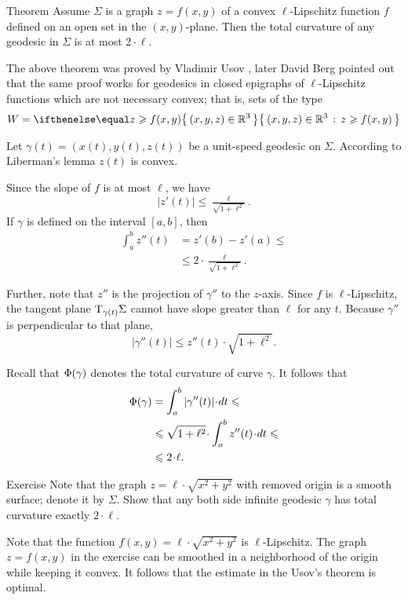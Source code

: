 \begin{thm}{Theorem}\label{thm:usov}
Assume $\Sigma$ is a graph $z=f(x,y)$ of a convex $\ell$-Lipschitz function $f$ defined on an open set in the $(x,y)$-plane.
Then the total curvature of any geodesic in $\Sigma$ is at most $2\cdot \ell$.
\end{thm}

The above theorem was proved by Vladimir Usov \cite{usov},
later David Berg \cite{berg} pointed out that the same proof works for geodesics in closed epigraphs of $\ell$-Lipschitz functions which are not necessary convex; that is, sets of the type 
\[W=\set{(x,y,z)\in\RR^3}{z\ge f(x,y)}\]

Let $\gamma(t)=(x(t),y(t),z(t))$ be a unit-speed geodesic on $\Sigma$.
According to Liberman's lemma 
$z(t)$ is convex.

Since the slope of $f$ is at most $\ell$, we have
\[|z'(t)|\le \tfrac{\ell}{\sqrt{1+\ell^2}}.\]
If $\gamma$ is defined on the interval $[a,b]$, then
\begin{align*}
\int_a^b z''(t)&=z'(b)-z'(a)\le 
\\
&\le 2\cdot \tfrac{\ell}{\sqrt{1+\ell^2}}.
\end{align*}

Further, note that $z''$ is the projection of $\gamma''$ to the $z$-axis.
Since $f$ is $\ell$-Lipschitz, the tangent plane $\mathrm{T}_{\gamma (t)} \Sigma$ cannot have slope greater than $\ell$ for any $t$.
Because $\gamma ''$ is perpendicular to that plane, 
\[|\gamma'' (t)|  \le  z''(t)\cdot\sqrt{1+ \ell ^2}.\]

Recall that $\Phi({\gamma})$ denotes the total curvature of curve $\gamma$.
It follows that 
\begin{align*}
\tc\gamma&=\int_a^b|\gamma'' (t)|\cdot dt\le 
\\
&\le \sqrt{1+ \ell ^2}\cdot  \int_a^b z''(t)\cdot dt\le 
\\
&\le 2\cdot \ell.
\end{align*}
\qedsf

\begin{thm}{Exercise}\label{ex:usov-exact}
Note that the graph $z=\ell\cdot\sqrt{x^2+y^2}$ with removed origin is a smooth surface; denote it by $\Sigma$.
Show that any both side infinite geodesic $\gamma$ has total curvature exactly $2\cdot \ell$.
\end{thm}

Note that the function $f(x,y)=\ell\cdot\sqrt{x^2+y^2}$ is $\ell$-Lipschitz.
The graph $z=f(x,y)$ in the exercise can be smoothed in a neighborhood of the origin while keeping it convex.
It follows that the estimate in the Usov's theorem is optimal.


